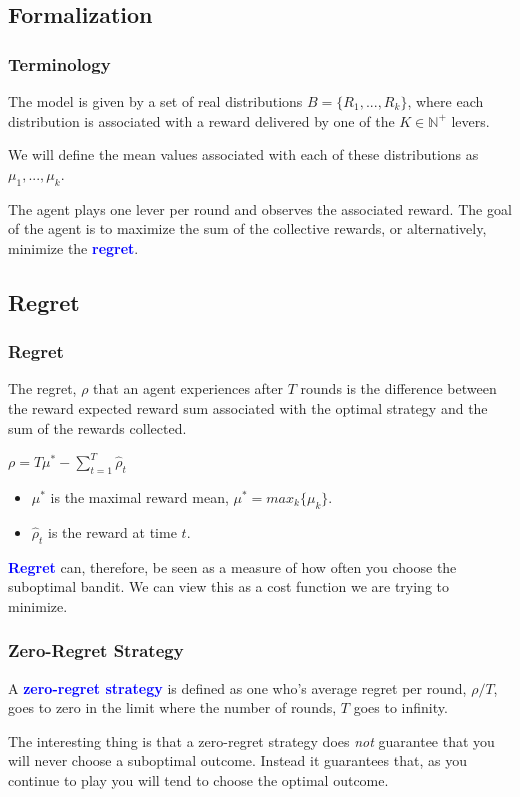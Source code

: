 \documentclass{beamer}
\begin{document}
\subsection{Formalization}
\begin{frame}
  \frametitle{Terminology}
  The model is given by a set of real distributions $ B = \{R_1,..., R_k\} $, where each distribution is associated with a reward delivered by one of the $ K \in \mathbb{N}^+$ levers. \vspace{3mm} \pause

  We will define the mean values associated with each of these distributions as $ \mu_1,..., \mu_k $. \vspace{3mm} \pause

  The agent plays one lever per round and observes the associated reward. The goal of the agent is to maximize the sum of the collective rewards, or alternatively, minimize the \textbf{\textcolor{blue}{regret}}.
\end{frame}

\subsection{Regret}
\begin{frame}
  \frametitle{Regret}
  The regret, $\rho$ that an agent experiences after $T$ rounds is the difference between the reward expected reward sum associated with the optimal strategy and the sum of the rewards collected.
  \begin{center}
    $\rho = T\mu^* - \sum\limits_{t=1}^{T}\hat{\rho}_t$
  \end{center}

  \begin{itemize}
    \item $\mu^*$ is the maximal reward mean, $\mu^* = max_k \{\mu_k\}$.
    \item $\hat{\rho}_t$ is the reward at time $t$.
  \end{itemize} \vspace{2mm} \pause

  \textbf{\textcolor{blue}{Regret}} can, therefore, be seen as a measure of how often you choose the suboptimal bandit. We can view this as a cost function we are trying to minimize.
\end{frame}

\begin{frame}
  \frametitle{Zero-Regret Strategy}
  A \textbf{\textcolor{blue}{zero-regret strategy}} is defined as one who's average regret per round, $\rho/T$, goes to zero in the limit where the number of rounds, $T$ goes to infinity. \vspace{6mm} \pause

  The interesting thing is that a zero-regret strategy does \textit{not} guarantee that you will never choose a suboptimal outcome. Instead it guarantees that, as you continue to play you will tend to choose the optimal outcome.
\end{frame}
\end{document}
